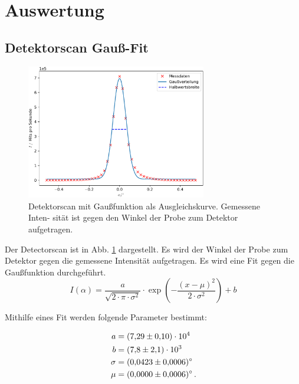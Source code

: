 \section{Auswertung}
\label{sec:Auswertung}

\subsection{Detektorscan Gauß-Fit}

\begin{figure}
  \centering
  \includegraphics[width=0.7\textwidth]{figures/detectorscan.pdf}
  \caption{Detektorscan mit Gaußfunktion als Ausgleichskurve. Gemessene Inten-
  sität ist gegen den Winkel der Probe zum Detektor aufgetragen.}
  \label{fig:detectorscan}
\end{figure}
\noindent

Der Detectorscan ist in Abb. \ref{fig:detectorscan} dargestellt.
Es wird der Winkel der Probe zum Detektor gegen die gemessene Intensität aufgetragen.
Es wird eine Fit gegen die Gaußfunktion durchgeführt.
\begin{equation}
  I(\alpha) = \frac{a}{\sqrt{2 \cdot \pi \cdot \sigma^2}} \cdot \exp\left(-\frac{(x - \mu)^2}{2 \cdot \sigma^2}\right) + b
\end{equation}

Mithilfe eines Fit werden folgende Parameter bestimmt:

\begin{align*}
  a &= \num{7.29+-0.10e+04} \\
  b &= \num{7.8+-2.1e+03} \\
  \sigma &= \SI{0.0423+-0.0006}{\degree} \\
  \mu &= \SI{-0.0000+-0.0006}{\degree} \, .
\end{align*}

